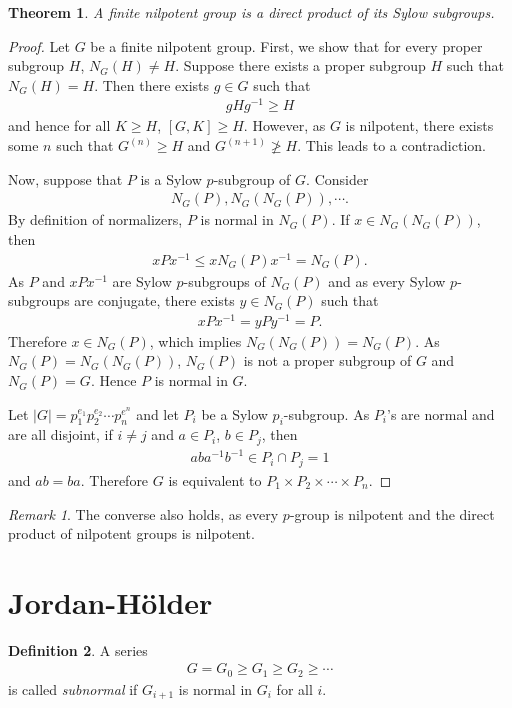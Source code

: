 \documentclass[12pt]{report}
\theoremstyle{plain}
\newtheorem{theorem}{Theorem}[section]
\theoremstyle{remark}
\newtheorem*{remark}{Remark}
\theoremstyle{definition}
\newtheorem{definition}[theorem]{Definition}
\begin{document}
\begin{theorem}
    A finite nilpotent group is a direct product of its Sylow subgroups.
\end{theorem}
\begin{proof}
    Let $G$ be a finite nilpotent group. First, we show that for every proper subgroup $H$, $N_G(H)\neq H$. Suppose there exists a proper subgroup $H$ such that $N_G(H)=H$. Then there exists $g\in G$ such that
    \begin{align*}
        gHg^{-1} \ge H
    \end{align*}
    and hence for all $K\ge H$, $[G,K]\ge H$. However, as $G$ is nilpotent, there exists some $n$ such that $G^{(n)}\ge H$ and $G^{(n+1)}\not\ge H$. This leads to a contradiction.

    Now, suppose that $P$ is a Sylow $p$-subgroup of $G$. Consider
    \begin{align*}
        N_G(P),N_G(N_G(P)),\cdots.
    \end{align*}
    By definition of normalizers, $P$ is normal in $N_G(P)$. If $x\in N_G(N_G(P))$, then
    \begin{align*}
        xPx^{-1}\le xN_G(P)x^{-1} = N_G(P).
    \end{align*}
    As $P$ and $xPx^{-1}$ are Sylow $p$-subgroups of $N_G(P)$ and as every Sylow $p$-subgroups are conjugate, there exists $y\in N_G(P)$ such that
    \begin{align*}
        xPx^{-1} = yPy^{-1}=P.
    \end{align*}
    Therefore $x\in N_G(P)$, which implies $N_G(N_G(P))=N_G(P)$. As $N_G(P)=N_G(N_G(P))$, $N_G(P)$ is not a proper subgroup of $G$ and $N_G(P)=G$. Hence $P$ is normal in $G$.

    Let $|G|=p_1^{e_1}p_2^{e_2}\cdots p_n^{e^n}$ and let $P_i$ be a Sylow $p_i$-subgroup. As $P_i$'s are normal and are all disjoint, if $i\neq j$ and $a\in P_i$, $b\in P_j$, then
    \begin{align*}
        aba^{-1}b^{-1}\in P_i\cap P_j = 1
    \end{align*}
    and $ab=ba$. Therefore $G$ is equivalent to $P_1\times P_2\times\cdots\times P_n$.
\end{proof}
\begin{remark}
    The converse also holds, as every $p$-group is nilpotent and the direct product of nilpotent groups is nilpotent.
\end{remark}


\section{Jordan-H\"older}
\begin{definition}
    A series
    \begin{align*}
        G=G_0\ge G_1\ge G_2\ge \cdots
    \end{align*}
    is called \emph{subnormal} if $G_{i+1}$ is normal in $G_i$ for all $i$.
\end{definition}
\end{document}
